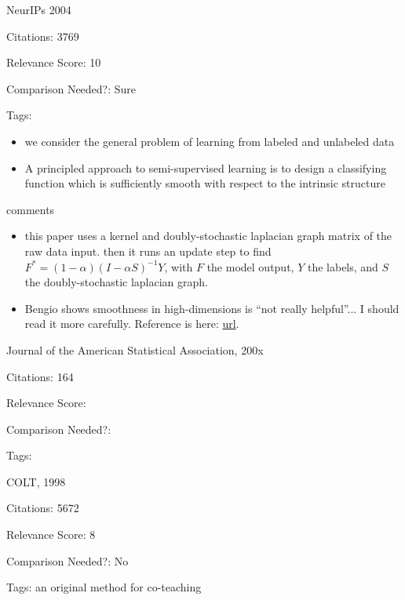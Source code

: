 \documentclass[11pt]{article}
\begin{document}
\noindent NeurIPs 2004

\noindent Citations: 3769

\noindent Relevance Score: 10

\noindent Comparison Needed?: Sure

\noindent Tags:

\begin{itemize}
\item we consider the general problem of learning from labeled and unlabeled data
\item A principled approach to semi-supervised learning is to design a classifying function which is sufficiently smooth with respect to the intrinsic structure 
\end{itemize}

\noindent comments
\begin{itemize}
\item this paper uses a kernel and doubly-stochastic laplacian graph matrix of the raw data input. then it runs an update step to find $F^* = (1 - \alpha)(I - \alpha S)^{-1}Y$, with $F$ the model output, $Y$ the labels, and $S$ the doubly-stochastic laplacian graph.
\item Bengio shows smoothness in high-dimensions is ``not really helpful''... I should read it more carefully. Reference is here: \href{http://cseweb.ucsd.edu/~gary/cs200/s12/bengio-lecun-07.pdf}{url}.
\end{itemize}


\vspace{2cm} 

\noindent Journal of the American Statistical Association, 200x

\noindent Citations: 164

\noindent Relevance Score:

\noindent Comparison Needed?: 

\noindent Tags:

\vspace{2cm} 

\noindent COLT, 1998

\noindent Citations: 5672

\noindent Relevance Score: 8

\noindent Comparison Needed?: No

\noindent Tags: an original method for co-teaching
\end{document}
